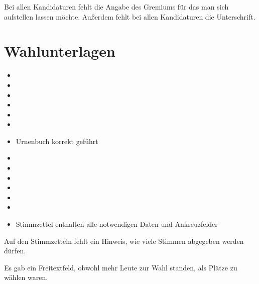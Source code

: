 \documentclass[a4paper]{scrartcl}
\newcommand{\fullcheck}{\raisebox{-.8\dp\strutbox}{\texttt{[image: Check.pdf]}}}
\newcommand{\semicheck}{\raisebox{-.8\dp\strutbox}{\texttt{[image: Semicheck.pdf]}}}
\newcommand{\nocheck}{\raisebox{-.8\dp\strutbox}{\texttt{[image: Nocheck.pdf]}}}
\newcommand{\dontknow}{\raisebox{-.8\dp\strutbox}{\texttt{[image: Dontknow.pdf]}}}
\newcommand{\notrev}{\raisebox{-.8\dp\strutbox}{\texttt{[image: Notrev.pdf]}}}
\newcommand{\sym}[1]{
\ifcase#1 \item[$\Box$]
\or \item[\fullcheck]
\or \item[\semicheck]
\or \item[\nocheck]
\or \item[\dontknow]
\or \item[\notrev]
\else \item[$\Box$]
\fi}
\begin{document}


Bei allen Kandidaturen fehlt die Angabe des Gremiums für das man sich aufstellen lassen möchte.
Außerdem fehlt bei allen Kandidaturen die Unterschrift.




\section{Wahlunterlagen}
\begin{itemize}[label=$\Box$]
\sym{1} Urnenbuch korrekt geführt
\sym{3} Stimmzettel enthalten alle notwendigen Daten und Ankreuzfelder
\end{itemize}

Auf den Stimmzetteln fehlt ein Hinweis, wie viele Stimmen abgegeben werden dürfen.

Es gab ein Freitextfeld, obwohl mehr Leute zur Wahl standen, als Plätze zu wählen waren.






\end{document}
